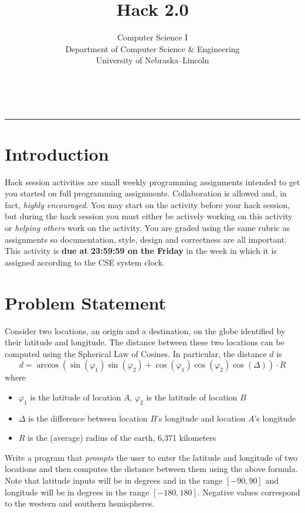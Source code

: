 \documentclass[12pt]{scrartcl}
\title{Hack 2.0}\let\Title\@title
\subtitle{Computer Science I\\
{\small
\vskip1cm
Department of Computer Science \& Engineering \\
University of Nebraska--Lincoln}
\vskip-1cm}
\date{~}
\begin{document}
\maketitle

\hrule

\section*{Introduction}

Hack session activities are small weekly programming assignments intended
to get you started on full programming assignments.  Collaboration is allowed
and, in fact, \emph{highly encouraged}.  You may start on the activity before
your hack session, but during the hack session you must either be actively 
working on this activity or \emph{helping others} work on the activity.
You are graded using the same rubric as assignments so documentation, style, 
design and correctness are all important.  This activity is \textbf{due 
at 23:59:59 on the Friday} in the week in which it is assigned according 
to the CSE system clock.


\section*{Problem Statement}

Consider two locations, an origin and a destination, on the globe 
identified by their latitude and longitude.  The distance between
these two locations can be computed using the Spherical Law of 
Cosines.  In particular, the distance $d$ is
 $$d = \arccos{(\sin(\varphi_1) \sin(\varphi_2) + \cos(\varphi_1) \cos(\varphi_2) \cos(\Delta) )} \cdot R$$
where
\begin{itemize}
  \item $\varphi_1$ is the latitude of location $A$, $\varphi_2$ is the latitude of location $B$
  \item $\Delta$ is the difference between location $B$'s longitude and location $A$'s longitude
  \item $R$ is the (average) radius of the earth, 6,371 kilometers
\end{itemize}

Write a program that \emph{prompts} the user to enter the latitude 
and longitude of two locations and then computes the distance between them using
the above formula.  Note that latitude inputs will be in degrees and in the
range $[-90, 90]$ and longitude will be in degrees in the range $[-180, 180]$.
Negative values correspond to the western and southern hemispheres.  
\end{document}
